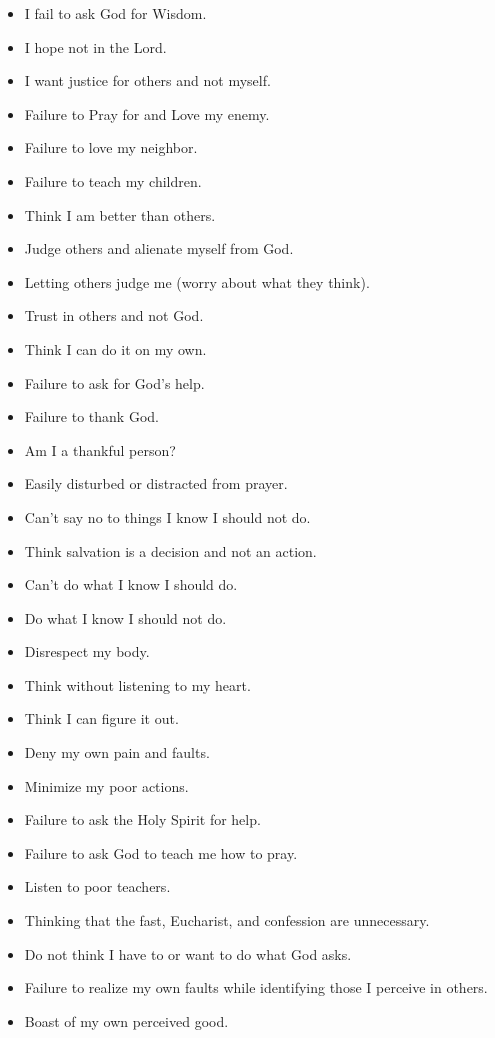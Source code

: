 \begin{itemize} \setlength\itemsep{0pt}
\item I fail to ask God for Wisdom.
\item I hope not in the Lord.
\item I want justice for others and not myself.
\item Failure to Pray for and Love my enemy.
\item Failure to love my neighbor.
\item Failure to teach my children.
\item Think I am better than others.
\item Judge others and alienate myself from God.
\item Letting others judge me (worry about what they think).
\item Trust in others and not God.
\item Think I can do it on my own.
\item Failure to ask for God's help.
\item Failure to thank God.
\item Am I a thankful person?
\item Easily disturbed or distracted from prayer.
\item Can't say no to things I know I should not do.
\item Think salvation is a decision and not an action.
\item Can't do what I know I should do.
\item Do what I know I should not do.
\item Disrespect my body.
\item Think without listening to my heart.
\item Think I can figure it out.
\item Deny my own pain and faults.
\item Minimize my poor actions.
\item Failure to ask the Holy Spirit for help.
\item Failure to ask God to teach me how to pray.
\item Listen to poor teachers.
\item Thinking that the fast, Eucharist, and confession are unnecessary.
\item Do not think I have to or want to do what God asks.
\item Failure to realize my own faults while identifying those I perceive in others.
\item Boast of my own perceived good.

\end{itemize}
